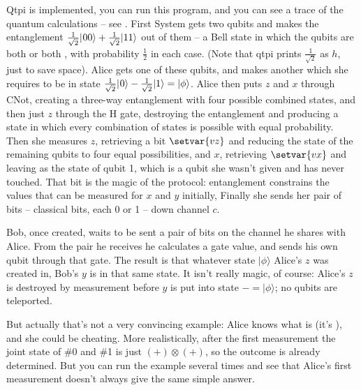 \documentclass[11pt,a4paper]{article}
\begin{document}
Qtpi is implemented, you can run this program, and you can see a trace of the quantum calculations -- see . First System gets two qubits and makes the entanglement $\frac{1}{\sqrt{2}}|\hspace{0.5pt}00\rangle+\frac{1}{\sqrt{2}}|11\rangle$ out of them -- a Bell state in which the qubits are both \zero{} or both \one{}, with probability $\frac{1}{2}$ in each case. (Note that qtpi prints $\frac{1}{\sqrt{2}}$ as $h$, just to save space). Alice gets one of these qubits, and makes another which she requires to be in state $\frac{1}{\sqrt{2}}|\hspace{0.5pt}0\rangle-\frac{1}{\sqrt{2}}|1\rangle=|\phi\rangle$. Alice then puts $z$ and $x$ through CNot, creating a three-way entanglement with four possible combined states, and then just $z$ through the H gate, destroying the entanglement and producing a state in which every combination of states is possible with equal probability. Then she measures $z$, retrieving a bit $\setvar{vz}$ and reducing the state of the remaining qubits to four equal possibilities, and $x$, retrieving $\setvar{vx}$ and leaving \plus as the state of qubit 1, which is a qubit she wasn't given and has never touched. That bit is the magic of the protocol: entanglement constrains the values that can be measured for $x$ and $y$ initially, Finally she sends her pair of bits -- classical bits, each 0 or 1 -- down channel $c$.

Bob, once created, waits to be sent a pair of bits on the channel he shares with Alice. From the pair he receives he calculates a gate value, and sends his own qubit through that gate. The result is that whatever state $|\phi\rangle$ Alice's $z$ was created in, Bob's $y$ is in that same state. It isn't really magic, of course: Alice's $z$ is destroyed by measurement before $y$ is put into state $\minus=|\phi\rangle$; no qubits are teleported. 

But actually that's not a very convincing example: Alice knows what \bv{\phi} is (it's \minus), and she could be cheating. More realistically, after the first measurement the joint state of \#0 and \#1 is just $(\plus)\otimes(\plus)$, so the outcome is already determined. But you can run the example several times and see that Alice's first measurement doesn't always give the same simple answer.
\end{document}
